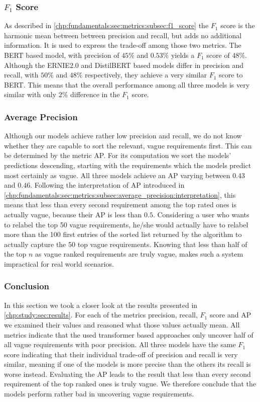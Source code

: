 \subsubsection{$F_1$ Score}
\label{chp:study:sec:interpretation:subsec:discussion:f1_score}
As described in \cref{chp:fundamentals:sec:metrics:subsec:f1_score} the $F_1$ score is the harmonic mean between between precision and recall, but adds no additional information.
It is used to express the trade-off among those two metrics.
The \ac{BERT} based model, with precision of $45\%$ and $0.53\%$ yields a $F_1$ score of $48\%$.
Although the \ac{ERNIE2.0} and \ac{DistilBERT} based models differ in precision and recall, with $50\%$ and $48\%$ respectively, they achieve a very similar $F_1$ score to \ac{BERT}.
This means that the overall performance among all three models is very similar with only $2\%$ difference in the $F_1$ score.

\subsubsection{Average Precision}
\label{chp:study:sec:interpretation:subsec:discussion:average_precision}
Although our models achieve rather low precision and recall, we do not know whether they are capable to sort the relevant, vague requirements first.
This can be determined by the metric \ac{AP}.
For its computation we sort the models' predictions descending, starting with the requirements which the models predict most certainly as vague.
All three models achieve an \ac{AP} varying between $0.43$ and $0.46$.
Following the interpretation of \ac{AP} introduced in \cref{chp:fundamentals:sec:metrics:subsec:average_precision:interpretation}, this means that less than every second requirement among the top rated ones is actually vague, because their \ac{AP} is less than $0.5$.
Considering a user who wants to relabel the top 50 vague requirements, he/she would actually have to relabel more than the 100 first entries of the sorted list returned by the algorithm to actually capture the 50 top vague requirements.
Knowing that less than half of the top $n$ as vague ranked requirements are truly vague, makes such a system impractical for real world scenarios.

\subsubsection{Conclusion}
\label{chp:study:sec:interpretation:subsec:discussion:usability}
In this section we took a closer look at the results presented in \cref{chp:study:sec:results}.
For each of the metrics precision, recall, $F_1$ score and \ac{AP} we examined their values and reasoned what those values actually mean.
All metrics indicate that the used transformer based approaches only uncover half of all vague requirements with poor precision.
All three models have the same $F_1$ score indicating that their individual trade-off of precision and recall is very similar, meaning if one of the models is more precise than the others its recall is worse instead.
Evaluating the \ac{AP} leads to the result that less than every second requirement of the top ranked ones is truly vague.
We therefore conclude that the models perform rather bad in uncovering vague requirements.
